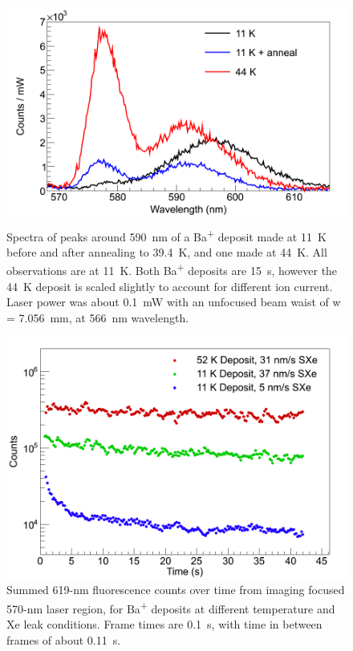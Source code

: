 
\begin{figure} %
        \centering
                \includegraphics[width=.7\textwidth]{figures/spectra_temperature_conditions.png}
                \caption{Spectra of peaks around 590~nm of a Ba\textsuperscript{+} deposit made at 11~K before and after annealing to 39.4~K, and one made at 44~K.  All observations are at 11~K.  Both Ba\textsuperscript{+} deposits are 15~s, however the 44~K deposit is scaled slightly to account for different ion current.  Laser power was about 0.1~mW with an unfocused beam waist of w = 7.056~mm, at 566~nm wavelength.}
\label{fig:specTempConditions}
\end{figure}

\begin{figure} [h]
        \centering
                \includegraphics[width=.7\textwidth]{figures/619_deposit_conditions.png}
                \caption{Summed 619-nm fluorescence counts over time from imaging focused 570-nm laser region, for Ba\textsuperscript{+} deposits at different temperature and Xe leak conditions.  Frame times are 0.1~s, with time in between frames of about 0.11~s.}
\label{fig:specTempConditions619}
\end{figure}

